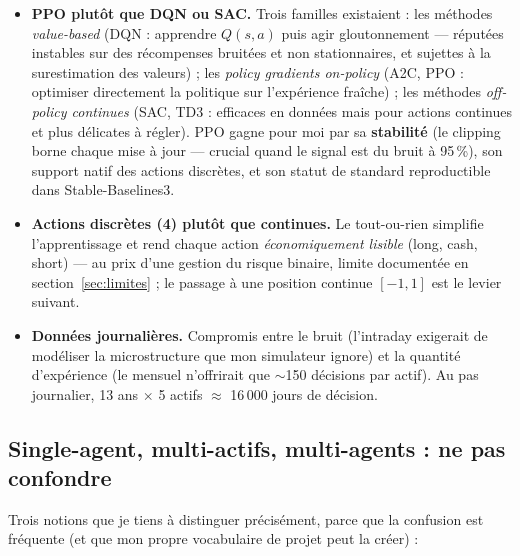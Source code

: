 \documentclass[11pt,a4paper]{article}
\begin{document}
\begin{itemize}[itemsep=3pt]
  \item \textbf{PPO plutôt que DQN ou SAC.} Trois familles existaient : les méthodes
        \emph{value-based} (DQN : apprendre $Q(s,a)$ puis agir gloutonnement ---
        réputées instables sur des récompenses bruitées et non stationnaires, et
        sujettes à la surestimation des valeurs) ; les \emph{policy gradients
        on-policy} (A2C, PPO : optimiser directement la politique sur l'expérience
        fraîche) ; les méthodes \emph{off-policy continues} (SAC, TD3 : efficaces en
        données mais pour actions continues et plus délicates à régler). PPO gagne pour
        moi par sa \textbf{stabilité} (le clipping borne chaque mise à jour --- crucial
        quand le signal est du bruit à 95\,\%), son support natif des actions
        discrètes, et son statut de standard reproductible dans Stable-Baselines3.
  \item \textbf{Actions discrètes (4) plutôt que continues.} Le tout-ou-rien simplifie
        l'apprentissage et rend chaque action \emph{économiquement lisible} (long,
        cash, short) --- au prix d'une gestion du risque binaire, limite documentée en
        section~\ref{sec:limites} ; le passage à une position continue $[-1, 1]$ est le
        levier suivant.
  \item \textbf{Données journalières.} Compromis entre le bruit (l'intraday exigerait
        de modéliser la microstructure que mon simulateur ignore) et la quantité
        d'expérience (le mensuel n'offrirait que $\sim$150 décisions par actif). Au
        pas journalier, 13 ans $\times$ 5 actifs $\approx$ 16\,000 jours de décision.
\end{itemize}

\subsection{Single-agent, multi-actifs, multi-agents : ne pas confondre}
\label{sec:marl}

Trois notions que je tiens à distinguer précisément, parce que la confusion est
fréquente (et que mon propre vocabulaire de projet peut la créer) :
\end{document}
